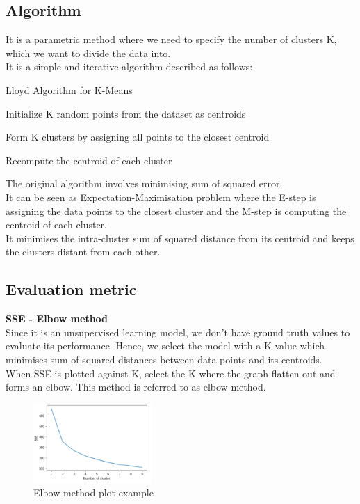 \documentclass[12pt,letterpaper, onecolumn]{exam}
\begin{document}
\subsection*{Algorithm}

It is a parametric method where we need to specify the number of clusters K, which we want to divide the data into.
\\It is a simple and iterative algorithm described as follows:

\begin{algorithm}
\caption{Lloyd  Algorithm for K-Means}\label{cap}
\begin{algorithmic}

\State Initialize K random points from the dataset as centroids

\Repeat

\State Form K clusters by assigning all points to the closest centroid

\State Recompute the centroid of each cluster

\end{algorithmic}
\end{algorithm}

The original algorithm involves minimising sum of squared error.\\
It can be seen as Expectation-Maximisation problem where the E-step is assigning the data points to the closest cluster and the M-step is computing the centroid of each cluster.\\
It minimises the intra-cluster sum of squared distance from its centroid and keeps the clusters distant from each other.

\subsection*{Evaluation metric}
\textbf{SSE - Elbow method}\\
Since it is an unsupervised learning model, we don't have ground truth values to evaluate its performance. Hence, we select the model with a K value which minimises sum of squared distances between data points and its centroids.\\
When SSE is plotted against K, select the K where the graph flatten out and forms an elbow. This method is referred to as elbow method.
\newpage
\begin{figure}[!h]
\caption{Elbow method plot example}
\centering
\includegraphics[width = 0.4\textwidth]{../images/elbowmethod.png}
\end{figure}
\end{document}

